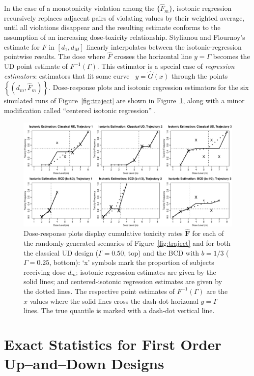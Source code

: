 In the case of a monotonicity violation among the $\{\hat{F}_m\}$, isotonic regression recursively replaces adjacent pairs of violating values by their weighted average, until all violations disappear and the resulting estimate conforms to the assumption of an increasing dose-toxicity relationship. Stylianou and Flournoy's estimate for $F$ in $[d_1,d_M]$ linearly interpolates between the isotonic-regression pointwise results. The dose where $\hat{F}$ crosses the horizontal line $y=\Gamma$ becomes the UD point estimate of $F^{-1}(\Gamma)$. This estimator is a special case of \emph{regression estimators}: estimators that fit some curve \ $y=\hat{G}(x)$ through the points $\left\{\left(d_m,\hat{F}_m\right)\right\}$.  Dose-response plots and isotonic regression estimators for the six simulated runs of Figure~\ref{fig:traject} are shown in Figure~\ref{fig:isot}, along with a minor modification called ``centered isotonic regression'' \citep[Section~3.3]{Oron07}.
%
\begin{figure}
\begin{center}
\includegraphics[scale=0.65]{isot}
\caption{Dose-response plots display cumulative toxicity rates $\mathbf{\hat{F}}$
for each of the randomly-generated scenarios of Figure~\ref{fig:traject} and for both the classical UD design ($\Gamma=0.50$, top) and the BCD with $b=1/3$ ($\Gamma=0.25$, bottom): `x' symbols mark the proportion of subjects receiving dose $d_m$; isotonic regression estimates are given by the solid lines; and centered-isotonic regression estimates are given by the dotted lines.  The respective point estimates of $F^{-1}(\Gamma)$ are the $x$ values where the solid lines cross the dash-dot horizonal $y=\Gamma$ lines. The true quantile is marked with a dash-dot vertical line.}\label{fig:isot}
\end{center}
\end{figure}


\chapter{Exact Statistics for First Order Up--and--Down Designs}

